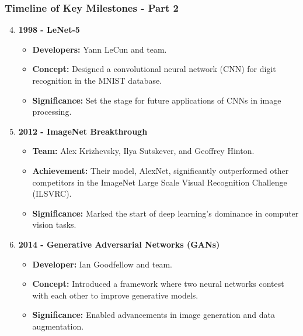 \documentclass[aspectratio=169]{beamer}
\begin{document}
\begin{frame}[fragile]
    \frametitle{Timeline of Key Milestones - Part 2}
    \begin{enumerate}
        \setcounter{enumi}{3} %

        \item \textbf{1998 - LeNet-5}
        \begin{itemize}
            \item \textbf{Developers:} Yann LeCun and team.
            \item \textbf{Concept:} Designed a convolutional neural network (CNN) for digit recognition in the MNIST database.
            \item \textbf{Significance:} Set the stage for future applications of CNNs in image processing.
        \end{itemize}

        \item \textbf{2012 - ImageNet Breakthrough}
        \begin{itemize}
            \item \textbf{Team:} Alex Krizhevsky, Ilya Sutskever, and Geoffrey Hinton.
            \item \textbf{Achievement:} Their model, AlexNet, significantly outperformed other competitors in the ImageNet Large Scale Visual Recognition Challenge (ILSVRC).
            \item \textbf{Significance:} Marked the start of deep learning's dominance in computer vision tasks.
        \end{itemize}

        \item \textbf{2014 - Generative Adversarial Networks (GANs)}
        \begin{itemize}
            \item \textbf{Developer:} Ian Goodfellow and team.
            \item \textbf{Concept:} Introduced a framework where two neural networks contest with each other to improve generative models.
            \item \textbf{Significance:} Enabled advancements in image generation and data augmentation.
        \end{itemize}
    \end{enumerate}
\end{frame}
\end{document}
